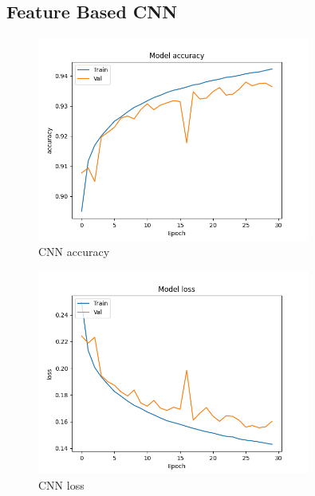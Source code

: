 \documentclass{article}
\begin{document}
    \subsection{Feature Based CNN}

    \begin{figure}[H]
        \centering
        \includegraphics[width=0.8\textwidth]{report_img/nn_results/feature_vector_cnn_26/metric_accuracy}
        \caption{CNN accuracy}
        \label{fig:}
    \end{figure}

    \begin{figure}[H]
        \centering
        \includegraphics[width=0.8\textwidth]{report_img/nn_results/feature_vector_cnn_26/metric_loss}
        \caption{CNN loss}
        \label{fig:}
    \end{figure}
\end{document}
